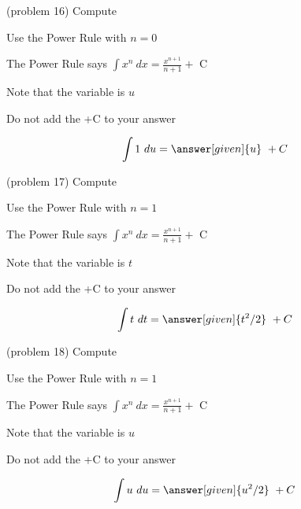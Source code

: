 \documentclass[handout]{ximera}
\begin{document}
\begin{problem}(problem 16)
Compute 



\begin{hint}
Use the Power Rule with $n=0$
\end{hint}
\begin{hint}
The Power Rule says $\int x^n \ dx = \frac{x^{n+1}}{n+1} +$ C
\end{hint}
\begin{hint}
Note that the variable is $u$
\end{hint}
\begin{hint}
\begin{center}
Do not add the +C to your answer
\end{center}
\end{hint}

\[
\int 1 \ du =
\answer[given]{u} \ + C
\]
\end{problem}




\begin{problem}(problem 17)
Compute 

\begin{hint}
Use the Power Rule with $n=1$
\end{hint}
\begin{hint}
The Power Rule says $\int x^n \ dx = \frac{x^{n+1}}{n+1} +$ C
\end{hint}
\begin{hint}
Note that the variable is $t$
\end{hint}
\begin{hint}
\begin{center}
Do not add the +C to your answer
\end{center}
\end{hint}

\[
\int t \ dt =
\answer[given]{t^2 /2} \ + C
\]
\end{problem}



\begin{problem}(problem 18)
Compute 

\begin{hint}
Use the Power Rule with $n=1$
\end{hint}
\begin{hint}
The Power Rule says $\int x^n \ dx = \frac{x^{n+1}}{n+1} +$ C
\end{hint}
\begin{hint}
Note that the variable is $u$
\end{hint}
\begin{hint}
\begin{center}
Do not add the +C to your answer
\end{center}
\end{hint}

\[
\int u \ du =
\answer[given]{u^2 /2} \ + C
\]
\end{problem}
\end{document}
